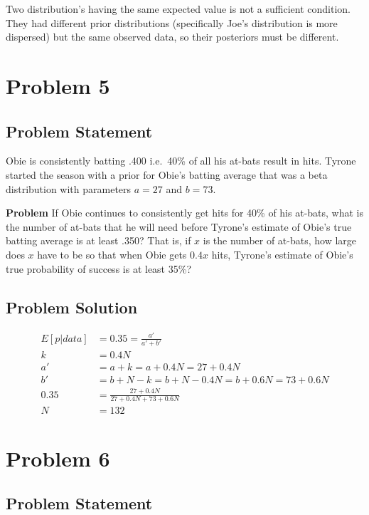 \documentclass[12pt]{article}
\theoremstyle{definition}
\begin{document}
Two distribution's having the same expected value is not a sufficient condition. They had different prior distributions (specifically Joe's distribution is more dispersed) but the same observed data, so their posteriors must be different.






\newpage
\section*{Problem 5}

\subsection*{Problem Statement}

Obie is consistently batting .400 i.e.\ 40\% of all his at-bats result in hits. Tyrone started the season with a prior for Obie's batting average that was a beta distribution with parameters $a = 27$ and $b = 73$.

\bigskip
\noindent
{\bf Problem} If Obie continues to consistently get hits for 40\% of his at-bats, what is the number of at-bats that he will need before Tyrone's estimate of Obie's true batting average is at least .350? That is, if $x$ is the number of at-bats, how large does $x$ have to be so that when Obie gets $0.4x$ hits, Tyrone's estimate of Obie's true probability of success is at least 35\%?


\subsection*{Problem Solution}
\begin{align*}
E[p|data] &= 0.35 = \frac{a'}{a' + b'}\\
k &= 0.4N\\
a' &= a + k = a + 0.4N = 27 + 0.4N\\
b' &= b + N - k = b + N - 0.4N = b + 0.6N = 73 + 0.6N\\
0.35 &= \frac{27 + 0.4N}{27 + 0.4N + 73 + 0.6N}\\
N &= 132
\end{align*}



\newpage
\section*{Problem 6}

\subsection*{Problem Statement}
\end{document}
